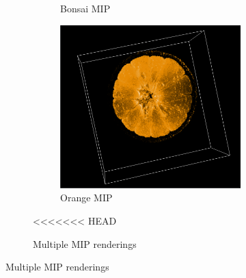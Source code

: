 \documentclass[a4paper,twoside,11pt]{article}
\begin{document}
\begin{figure}[h]
\begin{figure}[h!]
\begin{center}
\begin{subfigure}[b]{0.33\textwidth}
            \caption{Bonsai MIP}
            \label{fig:Bonsai}
        \end{subfigure}
        \begin{subfigure}[b]{0.30\textwidth}
            \includegraphics[width=\textwidth]{SanderImages/OrangeMIPZ.png}
            \caption{Orange MIP}
            \label{fig:OrangeMIP}
        \end{subfigure}
        \caption{Multiple MIP renderings}
    \end{center}
<<<<<<< HEAD
\end{figure} \newline
\newpage

\end{figure}
\end{document}
